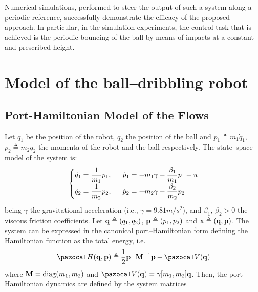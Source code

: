 Numerical simulations, performed to steer the output of such a system along a periodic reference, successfully demonstrate the efficacy of the proposed approach. In particular, in the simulation experiments, the control task that is achieved is the periodic bouncing of the ball by means of impacts at a constant and prescribed height.
%
\clearpage
\section{Model of the ball--dribbling robot}\label{sec:DBR}
%
\subsection{Port-Hamiltonian Model of the Flows}
Let $q_1$ be the position of the robot, $q_2$ the position of the ball and $p_1 \triangleq  m_1\dot{q}_1$, $p_2 \triangleq  m_2\dot{q}_2$ the momenta of the robot and the ball respectively.
The state--space model of the system is:
%
\begin{equation}\label{eq:state-space}
    \left\{ 
        \begin{matrix*}[l]\vspace{1pt}
            \dot{q}_1 = \dfrac{1}{m_1}p_1,~~&\dot{p}_1 = -m_1\gamma -\dfrac{\beta_1}{m_1}p_1 + u\\\vspace{1pt} 
            \dot{q}_2 = \dfrac{1}{m_2}p_2,~~&\dot{p}_2 = -m_2\gamma -\dfrac{\beta_2}{m_2}p_2

        \end{matrix*}
    \right.
\end{equation}
%
being $\gamma$ the gravitational acceleration (i.e., $\gamma = 9.81{m}/{s^2}$), and $\beta_1$, $\beta_2>0$ the viscous friction coefficients. Let $\mathbf{q} \triangleq (q_1,q_2)$, $\mathbf{p}\triangleq (p_1,p_2)$ and $\mathbf{x} \triangleq (\mathbf{q},\mathbf{p})$.
The system can be expressed in the canonical port--Hamiltonian form defining the Hamiltonian function as the total energy, i.e.
%
\begin{equation}
    \Ha(\qb,\pb) \triangleq \frac{1}{2}\pb^\top \Mb^{-1}\pb + \V(\qb)
\end{equation}
%
where $\mathbf{M} = \operatorname{diag}(m_1,m_2)$ and $\V(\qb) = \gamma[m_1,m_2]\qb$. Then, the port--Hamiltonian dynamics are defined by the system matrices
%
